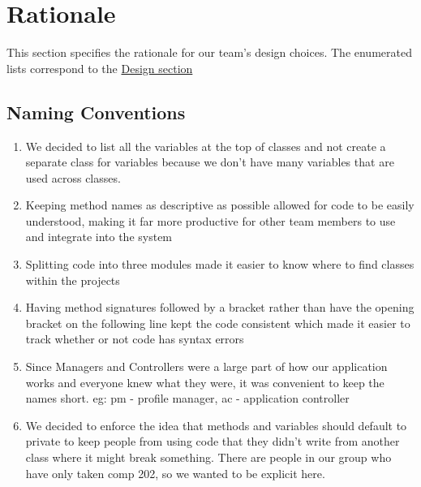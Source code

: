 \documentclass[12pt]{report}
\begin{document}
\section{Rationale}
\label{s:integration-rationale}
This section specifies the rationale for our team's design choices. The enumerated lists correspond
to the \hyperref[s:integration-design]{Design section}

\subsection{Naming Conventions}
\begin{enumerate}
	\item We decided to list all the variables at the top of classes and not create a separate class
		for variables because we don't have many variables that are used across classes.
    \item Keeping method names as descriptive as possible allowed for code to be easily understood,
		making it far more productive for other team members to use and integrate into the system
    \item Splitting code into three modules made it easier to know where to find classes within the projects
	\item Having method signatures followed by a bracket rather than have the opening bracket on the
		following line kept the code consistent which made it easier to track whether or not code
		has syntax errors
	\item Since Managers and Controllers were a large part of how our application works and everyone
		knew what they were, it was convenient to keep the names short. eg: pm - profile manager, ac
		- application controller
	\item We decided to enforce the idea that methods and variables should default to private to
		keep people from using code that they didn't write from another class where it might break
		something. There are people in our group who have only taken comp 202, so we wanted to be
		explicit here. 
\end{enumerate}
\end{document}
